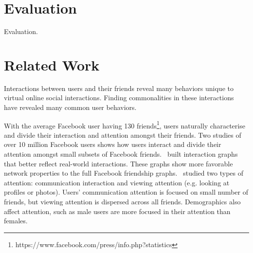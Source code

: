 \documentclass[letterpaper]{article}
\begin{document}
\section{Evaluation}


Evaluation.


\newpage


\mbox{}


\newpage


\mbox{}


\newpage


\section{Related Work}


Interactions between users and their friends reveal many behaviors unique to virtual online social interactions. Finding commonalities in these interactions have revealed many common user behaviors.


With the average Facebook user having 130 friends\footnote{https://www.facebook.com/press/info.php?statistics}, users naturally characterise and divide their interaction and attention amongst their friends. Two studies of over 10 million Facebook users shows how users interact and divide their attention amongst small subsets of Facebook friends.~\cite{wilson2009user} built interaction graphs that better reflect real-world interactions. These graphs show more favorable network properties to the full Facebook friendship graphs.~\cite{backstrom2011center} studied two types of attention: communication interaction and viewing attention (e.g. looking at profiles or photos). Users' communication attention is focused on small number of friends, but viewing attention is dispersed across all friends. Demographics also affect attention, such as male users are more focused in their attention than females. 
\end{document}
